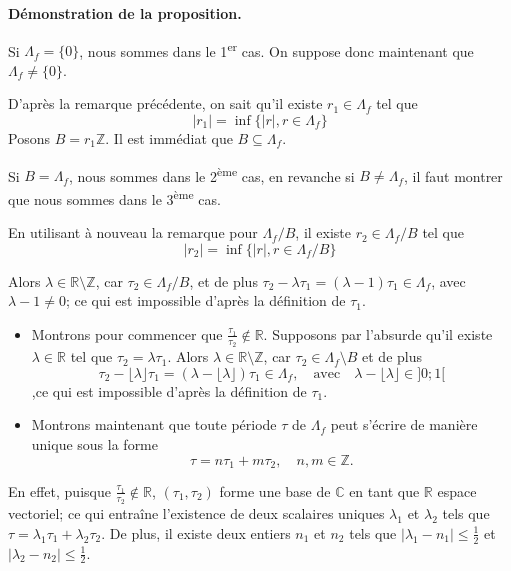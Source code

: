 \documentclass{article}
\begin{document}
\textbf{Démonstration de la proposition.}

Si \( \Lambda_f = \{0\} \), nous sommes dans le 1\textsuperscript{er} cas. On suppose donc maintenant que \( \Lambda_f \neq \{0\} \).

D'après la remarque précédente, on sait qu'il existe \( r_1 \in \Lambda_f \) tel que
\[
|r_1| = \inf\{|r|, r \in \Lambda_f\}
\]
Posons \( B = r_1\mathbb{Z} \). Il est immédiat que \( B \subseteq \Lambda_f \).

Si \( B = \Lambda_f \), nous sommes dans le 2\textsuperscript{ème} cas, en revanche si \( B \neq \Lambda_f \), il faut montrer que nous sommes dans le 3\textsuperscript{ème} cas.

En utilisant à nouveau la remarque pour \( \Lambda_f/B \), il existe \( r_2 \in \Lambda_f/B \) tel que
\[
|r_2| = \inf\{|r|, r \in \Lambda_f/B\}
\]

Alors \( \lambda \in \mathbb{R}\setminus\mathbb{Z} \), car \( \tau_2 \in \Lambda_f/B \), et de plus \( \tau_2 - \lambda\tau_1 = (\lambda - 1)\tau_1 \in \Lambda_f \), avec \( \lambda - 1 \neq 0 \); ce qui est impossible d'après la définition de \( \tau_1 \).
\begin{itemize}
    \item Montrons pour commencer que \( \frac{\tau_1}{\tau_2} \notin \mathbb{R} \). Supposons par l'absurde qu'il existe \( \lambda \in \mathbb{R} \) tel que \( \tau_2 = \lambda\tau_1 \).
    Alors \( \lambda \in \mathbb{R} \setminus \mathbb{Z} \), car \( \tau_2 \in \Lambda_f \setminus B \) et de plus  \[
        \tau_2 - \lfloor \lambda \rfloor \tau_1 = (\lambda - \lfloor \lambda \rfloor) \tau_1 \in \Lambda_f, \quad \text{avec} \quad \lambda - \lfloor \lambda \rfloor \in ]0; 1[
        \],ce qui est impossible d'après la définition de \( \tau_1 \).

    \item Montrons maintenant que toute période \( \tau \) de \( \Lambda_f \) peut s'écrire de manière unique sous la forme
    \[
    \tau = n\tau_1 + m\tau_2, \quad n, m \in \mathbb{Z}.
    \]
\end{itemize}

En effet, puisque \(\frac{\tau_1}{\tau_2} \notin \mathbb{R}\), \((\tau_1, \tau_2)\) forme une base de \(\mathbb{C}\) en tant que \(\mathbb{R}\) espace vectoriel; ce qui entraîne l'existence de deux scalaires uniques \(\lambda_1\) et \(\lambda_2\) tels que \(\tau = \lambda_1 \tau_1 + \lambda_2 \tau_2\). De plus, il existe deux entiers \(n_1\) et \(n_2\) tels que \(|\lambda_1 - n_1| \leq \frac{1}{2}\) et \(|\lambda_2 - n_2| \leq \frac{1}{2}\).
\end{document}
